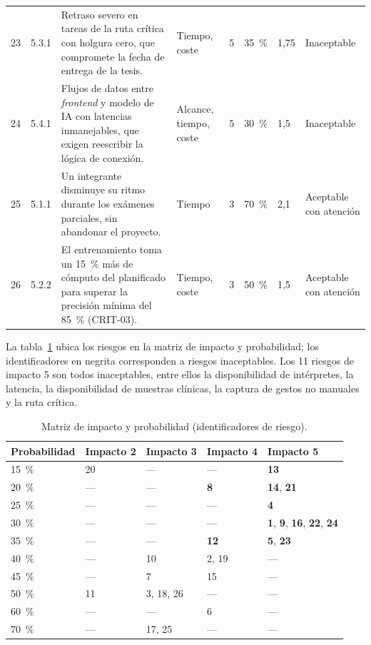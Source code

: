 {\begin{longtable}{@{}p{0.6cm}p{0.95cm}p{5.4cm}p{2.0cm}p{0.9cm}p{1.0cm}p{0.9cm}p{2.1cm}@{}}
23 & 5.3.1 & Retraso severo en tareas de la ruta crítica con holgura cero, que compromete la fecha de entrega de la tesis. & Tiempo, coste & 5 & 35~\% & 1,75 & Inaceptable \\
24 & 5.4.1 & Flujos de datos entre \emph{frontend} y modelo de IA con latencias inmanejables, que exigen reescribir la lógica de conexión. & Alcance, tiempo, coste & 5 & 30~\% & 1,5 & Inaceptable \\
25 & 5.1.1 & Un integrante disminuye su ritmo durante los exámenes parciales, sin abandonar el proyecto. & Tiempo & 3 & 70~\% & 2,1 & Aceptable con atención \\
26 & 5.2.2 & El entrenamiento toma un 15~\% más de cómputo del planificado para superar la precisión mínima del 85~\% (CRIT-03). & Tiempo, coste & 3 & 50~\% & 1,5 & Aceptable con atención \\
\end{longtable}
}

La tabla~\ref{tab:matriz} ubica los riesgos en la matriz de impacto y probabilidad; los identificadores en negrita corresponden a riesgos inaceptables. Los 11 riesgos de impacto 5 son todos inaceptables, entre ellos la disponibilidad de intérpretes, la latencia, la disponibilidad de muestras clínicas, la captura de gestos no manuales y la ruta crítica.

\begin{table}[htbp]
\centering
\caption{Matriz de impacto y probabilidad (identificadores de riesgo).}\label{tab:matriz}
\small
\begin{tabularx}{\textwidth}{@{}lXXXX@{}}
\toprule
\textbf{Probabilidad} & \textbf{Impacto 2} & \textbf{Impacto 3} & \textbf{Impacto 4} & \textbf{Impacto 5} \\
\midrule
15~\% & 20 & --- & --- & \textbf{13} \\
20~\% & --- & --- & \textbf{8} & \textbf{14}, \textbf{21} \\
25~\% & --- & --- & --- & \textbf{4} \\
30~\% & --- & --- & --- & \textbf{1}, \textbf{9}, \textbf{16}, \textbf{22}, \textbf{24} \\
35~\% & --- & --- & \textbf{12} & \textbf{5}, \textbf{23} \\
40~\% & --- & 10 & 2, 19 & --- \\
45~\% & --- & 7 & 15 & --- \\
50~\% & 11 & 3, 18, 26 & --- & --- \\
60~\% & --- & --- & 6 & --- \\
70~\% & --- & 17, 25 & --- & --- \\
\bottomrule
\end{tabularx}
\end{table}

